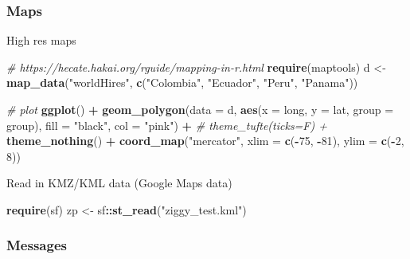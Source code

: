\documentclass[10,portrait]{article}
\newenvironment{Shaded}{\begin{snugshade}}{\end{snugshade}}
\newcommand{\KeywordTok}[1]{\textcolor[rgb]{0.13,0.29,0.53}{\textbf{#1}}}
\newcommand{\DataTypeTok}[1]{\textcolor[rgb]{0.13,0.29,0.53}{#1}}
\newcommand{\DecValTok}[1]{\textcolor[rgb]{0.00,0.00,0.81}{#1}}
\newcommand{\StringTok}[1]{\textcolor[rgb]{0.31,0.60,0.02}{#1}}
\newcommand{\CommentTok}[1]{\textcolor[rgb]{0.56,0.35,0.01}{\textit{#1}}}
\newcommand{\OperatorTok}[1]{\textcolor[rgb]{0.81,0.36,0.00}{\textbf{#1}}}
\newcommand{\NormalTok}[1]{#1}
\begin{document}
\subsubsection{Maps}\label{maps}

High res maps

\begin{Shaded}
\begin{Highlighting}[]
\CommentTok{# https://hecate.hakai.org/rguide/mapping-in-r.html}
\KeywordTok{require}\NormalTok{(maptools)}
\NormalTok{d <-}\StringTok{ }\KeywordTok{map_data}\NormalTok{(}\StringTok{"worldHires"}\NormalTok{, }\KeywordTok{c}\NormalTok{(}\StringTok{"Colombia"}\NormalTok{, }\StringTok{"Ecuador"}\NormalTok{, }
    \StringTok{"Peru"}\NormalTok{, }\StringTok{"Panama"}\NormalTok{))}

\CommentTok{# plot}
\KeywordTok{ggplot}\NormalTok{() }\OperatorTok{+}\StringTok{ }\KeywordTok{geom_polygon}\NormalTok{(}\DataTypeTok{data =}\NormalTok{ d, }\KeywordTok{aes}\NormalTok{(}\DataTypeTok{x =}\NormalTok{ long, }\DataTypeTok{y =}\NormalTok{ lat, }
    \DataTypeTok{group =}\NormalTok{ group), }\DataTypeTok{fill =} \StringTok{"black"}\NormalTok{, }\DataTypeTok{col =} \StringTok{"pink"}\NormalTok{) }\OperatorTok{+}\StringTok{ }
\StringTok{    }\CommentTok{# theme_tufte(ticks=F) +}
\KeywordTok{theme_nothing}\NormalTok{() }\OperatorTok{+}\StringTok{ }\KeywordTok{coord_map}\NormalTok{(}\StringTok{"mercator"}\NormalTok{, }\DataTypeTok{xlim =} \KeywordTok{c}\NormalTok{(}\OperatorTok{-}\DecValTok{75}\NormalTok{, }
    \OperatorTok{-}\DecValTok{81}\NormalTok{), }\DataTypeTok{ylim =} \KeywordTok{c}\NormalTok{(}\OperatorTok{-}\DecValTok{2}\NormalTok{, }\DecValTok{8}\NormalTok{))}
\end{Highlighting}
\end{Shaded}

Read in KMZ/KML data (Google Maps data)

\begin{Shaded}
\begin{Highlighting}[]
\KeywordTok{require}\NormalTok{(sf)}
\NormalTok{zp <-}\StringTok{ }\NormalTok{sf}\OperatorTok{::}\KeywordTok{st_read}\NormalTok{(}\StringTok{"ziggy_test.kml"}\NormalTok{)}
\end{Highlighting}
\end{Shaded}

\subsubsection{Messages}\label{messages}
\end{document}
